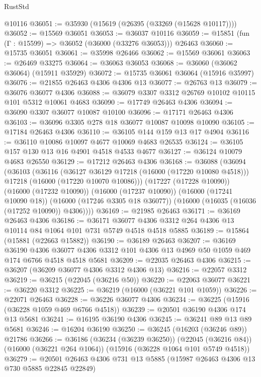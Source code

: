 \begin{lexlean}{RustStd}
\begin{coremodule}
    @10116
@36051 := @35930 (@15619 (@26395 (@33269 (@15628 @10117))))
@36052 := @15569 @36051
@36053 := @36037 @10116
@36059 := @15851 (fun (Γ : @15599) => @36052 (@36000 (@33276 @36053))) @26463
@36060 := @15735 @36051
@36061 := @35998 @26466
@36062 := @15569 @36061
@36063 := @26469 @33275
@36064 := @36063 @36053
@36068 := @36060 (@36062 @36064) (@15911 @35929)
@36072 := @15735 @36061 @36064 (@15916 @35997)
@36076 := @21855 @26463 @4306 @4306 @13
@36077 := @26763 @13
@36079 := @36076 @36077 @4306
@36088 := @36079 @3307 @3312 @26769 @10102 @10115 @101 @5312 @10061 @4683
@36090 := @17749 @26463 @4306
@36094 := @36090 @3307 @36077 @10087 @10100
@36096 := @17171 @26463 @4306
@36103 := @36096 @3305 @278 @18 @36077 @10087 @10098 @10090
@36105 := @17184 @26463 @4306
@36110 := @36105 @144 @159 @13 @17 @4904
@36116 := @36110 @10086 @10097 @4677 @10069 @4683 @26535
@36124 := @36105 @157 @130 @13 @16 @4901 @4518 @4533 @4677
@36127 := @36124 @10079 @4683 @26550
@36129 := @17212 @26463 @4306
@36168 := @36088
    (@36094
      (@36103
        (@36116
          (@36127 @36129 @17218 (@16000 (@17220 @10080 @4518)))
          @17218
          (@16000 (@17220 @10070 @10086)))
        (@17227 (@17228 @10090))
        (@16000 (@17232 @10090))
        (@16000 (@17237 @10090))
        (@16000 (@17241 @10090 @18))
        (@16000 (@17246 @3305 @18 @36077))
        (@16000 (@16035 (@16036 (@17252 @10090)) @4306))))
@36169 := @21985 @26463
@36171 := @36169 @26463 @4306
@36186 := @36171
    @36077
    @4306
    @3312
    @264
    @4306
    @13
    @10114
    @84
    @1064
    @101
    @731
    @5749
    @4518
    @4518
    @5885
@36189 := @15864 (@15881 (@22663 @15882))
@36190 := @36189 @26463
@36207 := @36169
    @36190
    @4306
    @36077
    @4306
    @3312
    @101
    @4306
    @13
    @4969
    @50
    @1059
    @469
    @174
    @6766
    @4518
    @4518
    @5681
@36209 := @22035 @26463 @4306
@36215 := @36207 (@36209 @36077 @4306 @3312 @4306 @13)
@36216 := @22057 @3312
@36219 := @36215 (@22045 (@36216 @50))
@36220 := @22063 @36077
@36221 := @36220 @3312
@36225 := @36219 (@16000 (@36221 @101 @1059))
@36226 := @22071 @26463
@36228 := @36226 @36077 @4306
@36234 := @36225 (@15916 (@36228 @1059 @469 @6766 @4518))
@36239 := @20501 @36190 @4306 @174 @13 @5681
@36241 := @16195 @36190 @4306
@36245 := @36241 @89 @13 @89 @5681
@36246 := @16204 @36190
@36250 := @36245 (@16203 (@36246 @89)) @21786
@36266 := @36186
    (@36234 (@36239 @36250))
    (@22045 (@36216 @84))
    (@16000 (@36221 @264 @1064))
    (@15916 (@36228 @1064 @101 @5749 @4518))
@36279 := @20501 @26463 @4306 @731 @13 @5885 (@15987 @26463 @4306 @13 @730 @5885 @22845 @22849)

\end{coremodule}
\end{lexlean}
